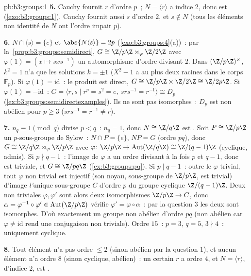 \begin{solution}{pb:b3:groups:1}
\textbf{5.} Cauchy fournit $r$ d'ordre $p$~; $N = \langle r
\rangle$ a indice $2$, donc est  (\cref{exo:b3:groups:1}).
Cauchy fournit aussi $s$ d'ordre $2$, et $s \notin N$ (tous les
éléments non identité de $N$ ont l'ordre impair $p$).

\textbf{6.} $N \cap \langle s \rangle = \{e\}$ et $\abs{N\langle
s\rangle} = 2p$ (\cref{exo:b3:groups:4}(a))~: par
la~\cref{prop:b3:groups:semidirect}, $G \cong \Z/p\Z
\rtimes_\varphi \Z/2\Z$ avec $\varphi(1) = (x \mapsto
sxs^{-1})$ un automorphisme d'ordre divisant $2$. Dans
$(\Z/p\Z)^\times$, $k^2 = 1$ n'a que les solutions $k = \pm 1$
($X^2 - 1$ a au plus deux racines dans le corps $\mathbb F_p$).
Si $\varphi(1) = \mathrm{id}$~: le produit est direct, $G \cong
\Z/p\Z \times \Z/2\Z \cong \Z/2p\Z$. Si $\varphi(1) =
-\mathrm{id}$~: $G = \langle r, s \mid r^p = s^2 = e,\ srs^{-1}
= r^{-1}\rangle \cong D_p$
(\cref{ex:b3:groups:semidirectexamples}). Ils ne sont pas
isomorphes~: $D_p$ est non abélien pour $p \geq 3$ ($srs^{-1} =
r^{-1} \neq r$).

\textbf{7.} $n_q \equiv 1 \pmod q$ divise $p < q$~: $n_q = 1$,
donc $N \cong \Z/q\Z$ est . Soit $P \cong \Z/p\Z$ un
$p$-sous-groupe de Sylow~: $N \cap P = \{e\}$, $NP = G$ (ordre
$pq$), donc $G \cong \Z/q\Z \rtimes_\varphi \Z/p\Z$ avec
$\varphi \colon \Z/p\Z \to \operatorname{Aut}(\Z/q\Z) \cong
\Z/(q-1)\Z$ (cyclique, admis). Si $p \nmid q - 1$~: l'image de
$\varphi$ a un ordre divisant à la fois $p$ et $q-1$, donc est
triviale, et $G \cong \Z/pq\Z$ (\cref{ex:b3:groups:pq}). Si $p
\mid q - 1$~: outre le $\varphi$ trivial, tout $\varphi$ non
trivial est injectif (son noyau, sous-groupe de $\Z/p\Z$, est
trivial) d'image \emph{l'}unique sous-groupe $C$ d'ordre $p$ du
groupe cyclique $\Z/(q-1)\Z$. Deux  non triviales
$\varphi, \varphi'$ sont alors deux isomorphismes $\Z/p\Z \to
C$, donc $\alpha = \varphi^{-1}\circ\varphi' \in
\operatorname{Aut}(\Z/p\Z)$ vérifie $\varphi' =
\varphi\circ\alpha$~: par la question 3 les deux  sont isomorphes. D'où exactement un groupe non
abélien d'ordre $pq$ (non abélien car $\varphi \neq \mathrm{id}$
rend une conjugaison non triviale). Ordre $15$~: $p = 3$, $q =
5$, $3 \nmid 4$~: uniquement cyclique.

\textbf{8.} Tout élément n'a pas ordre $\leq 2$ (sinon abélien
par la question 1), et aucun élément n'a ordre $8$ (sinon
cyclique, abélien)~: un certain $r$ a ordre $4$, et $N = \langle
r\rangle$, d'indice $2$, est .


\end{solution}
